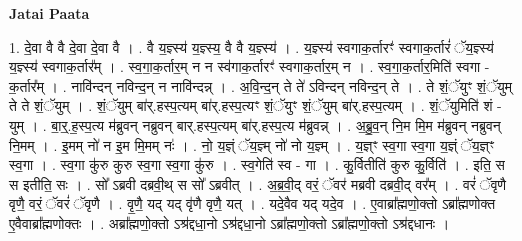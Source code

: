 \documentclass[17pt]{extarticle}
\begin{document}
\textbf{Jatai Paata} \newline

1. दे॒वा वै वै दे॒वा दे॒वा वै । . वै य॒ज्ञ्स्य॑ य॒ज्ञ्स्य॒ वै वै य॒ज्ञ्स्य॑ । . य॒ज्ञ्स्य॑ स्वगाक॒र्तारꣳ॑ स्वगाक॒र्तारं॑ ॅय॒ज्ञ्स्य॑ य॒ज्ञ्स्य॑ स्वगाक॒र्तार᳚म् । . स्व॒गा॒क॒र्तार॒म् न न स्व॑गाक॒र्तारꣳ॑ स्वगाक॒र्तार॒म् न । . स्व॒गा॒क॒र्तार॒मिति॑ स्वगा - क॒र्तार᳚म् । . नावि॑न्दन् नविन्द॒न् न नावि॑न्दन्न् । . अ॒वि॒न्द॒न् ते ते॑ ऽविन्दन् नविन्द॒न् ते । . ते शं॒ॅयुꣳ शं॒ॅयुम् ते ते शं॒ॅयुम् । . शं॒ॅयुम् बा॑र्.हस्प॒त्यम् बा॑र्.हस्प॒त्यꣳ शं॒ॅयुꣳ शं॒ॅयुम् बा॑र्.हस्प॒त्यम् । . शं॒ॅयुमिति॑ शं - युम् । . बा॒र्॒.ह॒स्प॒त्य म॑ब्रुवन् नब्रुवन् बार्.हस्प॒त्यम् बा॑र्.हस्प॒त्य म॑ब्रुवन्न् । . अ॒ब्रु॒व॒न् नि॒म मि॒म म॑ब्रुवन् नब्रुवन् नि॒मम् । . इ॒मम् नो॑ न इ॒म मि॒मम् नः॑ । . नो॒ य॒ज्ञ्ं ॅय॒ज्ञ्म् नो॑ नो य॒ज्ञ्म् । . य॒ज्ञ्ꣳ स्व॒गा स्व॒गा य॒ज्ञ्ं ॅय॒ज्ञ्ꣳ स्व॒गा । . स्व॒गा कु॑रु कुरु स्व॒गा स्व॒गा कु॑रु । . स्व॒गेति॑ स्व - गा । . कु॒र्वितीति॑ कुरु कु॒र्विति॑ । . इति॒ स स इतीति॒ सः । . सो᳚ ऽब्रवी दब्रवी॒थ् स सो᳚ ऽब्रवीत् । . अ॒ब्र॒वी॒द् वरं॒ ॅवर॑ मब्रवी दब्रवी॒द् वर᳚म् । . वरं॑ ॅवृणै वृणै॒ वरं॒ ॅवरं॑ ॅवृणै । . वृ॒णै॒ यद् यद् वृ॑णै वृणै॒ यत् । . यदे॒वैव यद् यदे॒व । . ए॒वाब्रा᳚ह्मणो॒क्तो ऽब्रा᳚ह्मणोक्त ए॒वैवाब्रा᳚ह्मणोक्तः । . अब्रा᳚ह्मणो॒क्तो ऽश्र॑द्दधा॒नो ऽश्र॑द्दधा॒नो ऽब्रा᳚ह्मणो॒क्तो ऽब्रा᳚ह्मणो॒क्तो ऽश्र॑द्दधानः । \newline
\end{document}
